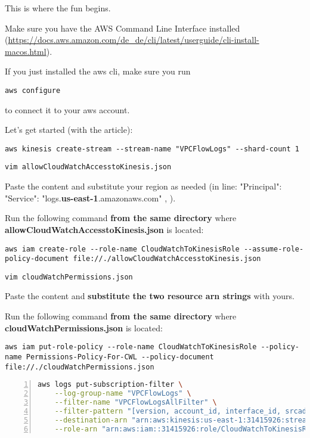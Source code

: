 This is where the fun begins. 

Make sure you have the AWS Command Line Interface installed (\scriptsize{\url{https://docs.aws.amazon.com/de_de/cli/latest/userguide/cli-install-macos.html}}). 

If you just installed the aws cli, make sure you run \begin{lstlisting}[numbers=none]
aws configure
\end{lstlisting} 
to connect it to your aws account. 

Let's get started (with the article):

\begin{lstlisting}[numbers=none]
aws kinesis create-stream --stream-name "VPCFlowLogs" --shard-count 1\end{lstlisting}

\begin{lstlisting}[numbers=none]
vim allowCloudWatchAccesstoKinesis.json
\end{lstlisting}

Paste the content and substitute your region as needed (in line:  "Principal": { "Service": "logs.\textbf{us-east-1}.amazonaws.com" }, ).

Run the following command \textbf{from the same directory} where \textbf{allowCloudWatchAccesstoKinesis.json} is located:

\begin{lstlisting}[numbers=none]
aws iam create-role --role-name CloudWatchToKinesisRole --assume-role-policy-document file://./allowCloudWatchAccesstoKinesis.json
\end{lstlisting}

\begin{lstlisting}[numbers=none]
vim cloudWatchPermissions.json
\end{lstlisting}


Paste the content and \textbf{substitute the two resource arn strings} with yours.

Run the following command \textbf{from the same directory} where \textbf{cloudWatchPermissions.json} is located:

\begin{lstlisting}[numbers=none]
aws iam put-role-policy --role-name CloudWatchToKinesisRole --policy-name Permissions-Policy-For-CWL --policy-document file://./cloudWatchPermissions.json
\end{lstlisting}


\begin{lstlisting}[language=bash,numbers=left,stepnumber=1,breaklines=true]
aws logs put-subscription-filter \
    --log-group-name "VPCFlowLogs" \
    --filter-name "VPCFlowLogsAllFilter" \
    --filter-pattern "[version, account_id, interface_id, srcaddr != "-", dstaddr != "-", srcport != "-", dstport != "-", protocol, packets, bytes, start, end, action, log_status]" \
    --destination-arn "arn:aws:kinesis:us-east-1:31415926:stream/VPCFlowLogs" \
    --role-arn "arn:aws:iam::31415926:role/CloudWatchToKinesisRole"

\end{lstlisting}

